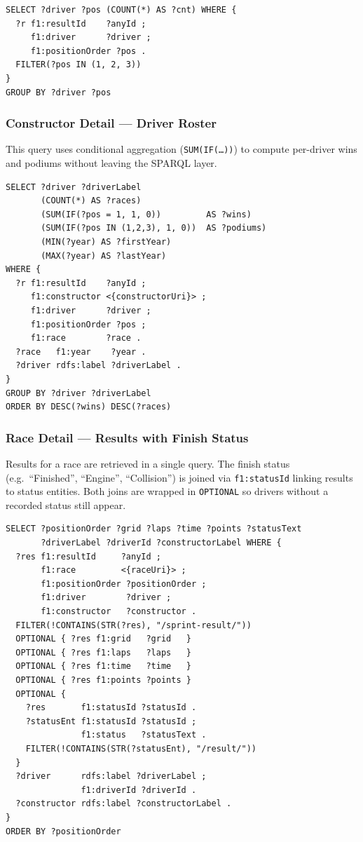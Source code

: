 \documentclass[12pt,a4paper]{article}
\begin{document}
\begin{lstlisting}[style=sparql, caption={Podium breakdown (positions 1, 2, 3) per driver}]
SELECT ?driver ?pos (COUNT(*) AS ?cnt) WHERE {
  ?r f1:resultId    ?anyId ;
     f1:driver      ?driver ;
     f1:positionOrder ?pos .
  FILTER(?pos IN (1, 2, 3))
}
GROUP BY ?driver ?pos
\end{lstlisting}

\subsubsection{Constructor Detail --- Driver Roster}

This query uses conditional aggregation (\texttt{SUM(IF(\ldots))}) to compute
per-driver wins and podiums without leaving the SPARQL layer.

\begin{lstlisting}[style=sparql, caption={Driver roster with win and podium counts for a constructor}]
SELECT ?driver ?driverLabel
       (COUNT(*) AS ?races)
       (SUM(IF(?pos = 1, 1, 0))         AS ?wins)
       (SUM(IF(?pos IN (1,2,3), 1, 0))  AS ?podiums)
       (MIN(?year) AS ?firstYear)
       (MAX(?year) AS ?lastYear)
WHERE {
  ?r f1:resultId    ?anyId ;
     f1:constructor <{constructorUri}> ;
     f1:driver      ?driver ;
     f1:positionOrder ?pos ;
     f1:race        ?race .
  ?race   f1:year    ?year .
  ?driver rdfs:label ?driverLabel .
}
GROUP BY ?driver ?driverLabel
ORDER BY DESC(?wins) DESC(?races)
\end{lstlisting}

\subsubsection{Race Detail --- Results with Finish Status}

Results for a race are retrieved in a single query. The finish status (e.g.\
``Finished'', ``Engine'', ``Collision'') is joined via \texttt{f1:statusId}
linking results to status entities. Both joins are wrapped in \texttt{OPTIONAL}
so drivers without a recorded status still appear.

\begin{lstlisting}[style=sparql, caption={Race results with finish status join}]
SELECT ?positionOrder ?grid ?laps ?time ?points ?statusText
       ?driverLabel ?driverId ?constructorLabel WHERE {
  ?res f1:resultId     ?anyId ;
       f1:race         <{raceUri}> ;
       f1:positionOrder ?positionOrder ;
       f1:driver        ?driver ;
       f1:constructor   ?constructor .
  FILTER(!CONTAINS(STR(?res), "/sprint-result/"))
  OPTIONAL { ?res f1:grid   ?grid   }
  OPTIONAL { ?res f1:laps   ?laps   }
  OPTIONAL { ?res f1:time   ?time   }
  OPTIONAL { ?res f1:points ?points }
  OPTIONAL {
    ?res       f1:statusId ?statusId .
    ?statusEnt f1:statusId ?statusId ;
               f1:status   ?statusText .
    FILTER(!CONTAINS(STR(?statusEnt), "/result/"))
  }
  ?driver      rdfs:label ?driverLabel ;
               f1:driverId ?driverId .
  ?constructor rdfs:label ?constructorLabel .
}
ORDER BY ?positionOrder
\end{lstlisting}
\end{document}

